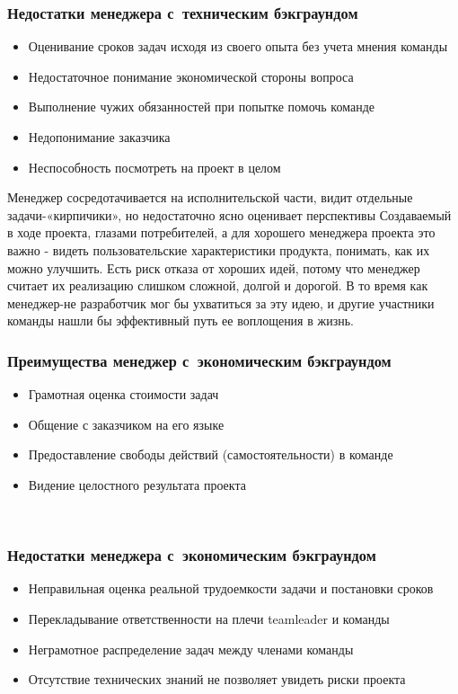 \documentclass{../industrial-development}
\begin{document}
{{{{{{{{{{{{{{{\begin{frame} \frametitle{Недостатки менеджера с~техническим бэкграундом}
	 \begin{itemize}
                      \item Оценивание сроков задач исходя из своего опыта без учета мнения команды
		\item Недостаточное понимание экономической стороны вопроса
		\item Выполнение чужих обязанностей при попытке помочь команде
		\item Недопонимание заказчика
		\item Неспособность посмотреть на проект в целом
	\end{itemize} 	
\end{frame}
\lecturenotes
Менеджер сосредотачивается на исполнительской части, видит отдельные задачи\nobreakdash-«кирпичики», но недостаточно ясно оценивает перспективы
Создаваемый в ходе проекта, глазами потребителей, а для хорошего менеджера проекта это важно \nobreakdash- видеть пользовательские характеристики продукта, понимать, как их можно улучшить.
Есть риск отказа от хороших идей, потому что менеджер считает их реализацию слишком сложной, долгой и дорогой. В то время как менеджер-не разработчик мог бы ухватиться за эту идею, и другие участники команды нашли бы эффективный путь ее воплощения в жизнь.
~\cite{How_to_be_a_good_IT-manager}

\begin{frame} \frametitle{Преимущества менеджер с~экономическим бэкграундом}
	 \begin{itemize}
                      \item Грамотная оценка стоимости задач
		\item Общение с заказчиком на его языке
		\item Предоставление свободы действий (самостоятельности) в команде
		\item Видение целостного результата проекта
	\end{itemize} 	
\end{frame}
\lecturenotes

~\cite{How_to_be_a_good_IT-manager}

\begin{frame} \frametitle{Недостатки менеджера с~экономическим бэкграундом}
	 \begin{itemize}
                      \item Неправильная оценка реальной трудоемкости задачи и постановки сроков
		\item Перекладывание ответственности на плечи teamleader и команды
		\item Неграмотное распределение задач между членами команды
		\item Отсутствие технических знаний не позволяет увидеть риски проекта
	\end{itemize} 	
\end{frame}
\lecturenotes

}}}}}}}}}}}}}}}
\end{document}
